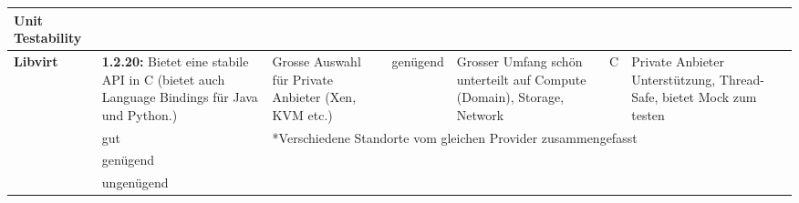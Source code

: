 \begin{landscape}
\begin{table}[h]
\begin{tabularx}{\linewidth}{|l|X|X|l|X|l|X|}
Unit Testability
\\
\hline
\textbf{Libvirt}	
&
\cellcolor{green!25}
\textbf{1.2.20:}  Bietet eine stabile API in C 
(bietet auch Language Bindings für Java und Python.)
&
\cellcolor{green!25}
Grosse Auswahl für Private Anbieter (Xen, KVM etc.)
&
 \cellcolor{yellow!25}	
genügend
&
\cellcolor{green!25}
Grosser Umfang schön unterteilt auf Compute (Domain), Storage, Network
&
\cellcolor{green!25}
C
&
\cellcolor{green!25}
Private Anbieter Unterstützung, Thread-Safe, 
bietet Mock zum testen
\\
\hline
\cellcolor{green!25}
& 
gut
&
\multicolumn{5}{l|}{*Verschiedene Standorte vom gleichen Provider zusammengefasst}
\\
 \cellcolor{yellow!25}	
 &
 \multicolumn{6}{l}{genügend}
 \\
 \cellcolor{red!50}
 &
 \multicolumn{6}{l}{ungenügend}
 \\
   
  \end{tabularx}
  \end{table}
\end{landscape}
\restoregeometry
